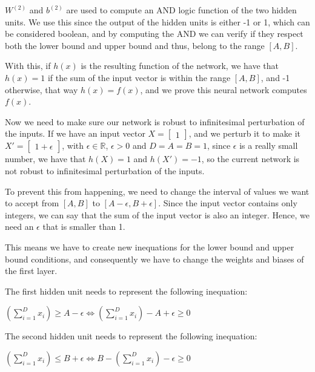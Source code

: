 \documentclass{article}
\begin{document}
\bigskip

\(W^{(2)}\) and \(b^{(2)}\) are used to compute an AND logic function of the two hidden units. We use this since the output of
the hidden units is either -1 or 1, which can be considered boolean, and by computing the AND we can verify if they respect both the 
lower bound and upper bound and thus, belong to the range \([A, B]\). 

With this, if \(h(x)\) is the resulting function of the network, we have that \(h(x) = 1\) if the sum of the input vector is within the range \([A, B]\),
and -1 otherwise, that way \(h(x) = f(x)\), and we prove this neural network computes \(f(x)\).

\bigskip

Now we need to make sure our network is robust to infinitesimal perturbation of the inputs.
If we have an input vector $X = \begin{bmatrix}
    1
\end{bmatrix}
$, and we perturb it to make it $X' = \begin{bmatrix}
    1 + \epsilon
\end{bmatrix}
$, with $\epsilon \in \mathbb{R}$, $\epsilon > 0$ and $D = A = B = 1$, since $\epsilon$ is a really small number, 
we have that $h(X) = 1$ and $h(X') = -1$, so the current network is not robust to infinitesimal perturbation of the inputs.

\bigskip

To prevent this from happening, we need to change the interval of values we want to accept from $[A, B]$ to $[A - \epsilon, B + \epsilon]$.
Since the input vector contains only integers, we can say that
the sum of the input vector is also an integer. Hence, we need an $\epsilon$ that is smaller than 1. 

This means we have to create new inequations for the lower bound and upper bound conditions, 
and consequently we have to change the weights and biases of the first layer.

The first hidden unit needs to represent the following inequation:

\bigskip

$(\sum_{i=1}^{D} x_i) \geq A - \epsilon \iff (\sum_{i=1}^{D} x_i) - A + \epsilon \geq 0$

\bigskip

The second hidden unit needs to represent the following inequation:

\bigskip

$(\sum_{i=1}^{D} x_i) \leq B + \epsilon \iff B - (\sum_{i=1}^{D} x_i) - \epsilon \geq 0$
\end{document}
